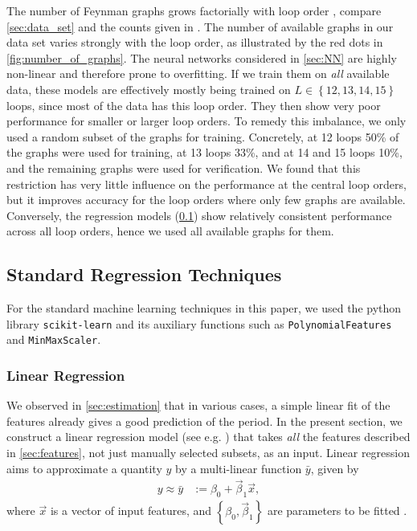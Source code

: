\documentclass[12pt]{article}
\numberwithin{equation}{section}
\begin{document}
The number of Feynman graphs grows factorially with loop order \cite{cvitanovic_number_1978,borinsky_renormalized_2017}, compare \cref{sec:data_set} and the counts given in \cite{balduf_statistics_2023}.   The number of available graphs in our data set varies strongly with the loop order, as illustrated by the red dots in \cref{fig:number_of_graphs}. The neural networks considered in \cref{sec:NN} are highly non-linear and therefore prone to overfitting. 
If we train them on \emph{all} available data, these models are effectively mostly being trained on $L\in \left \lbrace 12, 13,14,15 \right \rbrace $ loops, since most of the data has this loop order. They then show very poor performance for smaller or larger loop orders. To remedy this imbalance, we only used a random subset of the graphs for training. Concretely, at 12 loops 50\% of the graphs were used for training, at 13 loops 33\%, and at 14 and 15 loops 10\%, and the remaining graphs were used for verification. We found that this restriction has very little influence on the performance at the central loop orders, but it improves accuracy for the loop orders where only few graphs are available.  Conversely, the regression models   (\cref{sec:standard_machine_learning}) show relatively consistent performance across all loop orders, hence we used all available graphs for them. 





\subsection{Standard Regression Techniques}\label{sec:standard_machine_learning}

For the standard machine learning techniques in this paper, we used the python library  \texttt{scikit-learn}  \cite{pedregosa_scikitlearn_2012} and its auxiliary functions such as \texttt{PolynomialFeatures} and \texttt{MinMaxScaler}.  

\subsubsection{Linear Regression}\label{sec:linear_regression}
We observed in \cref{sec:estimation} that in various cases, a simple linear fit of the features already gives a good prediction of the period. In the present section, we construct a  linear regression model (see e.g. \cite{maulud_review_2020}) that takes \emph{all} the features described in \cref{sec:features}, not just manually selected subsets, as an input.
Linear regression aims to approximate a quantity $y$  by a multi-linear function $\bar y$, given by
\begin{align}\label{def:linear_regression}
y  \approx \bar y  &:= \beta_0 + \vec \beta_1 \vec x, 
\end{align}
where   $\vec x$ is a vector of input features, and $\left \lbrace \beta_0, \vec \beta_1 \right \rbrace $ are parameters to be fitted .
\end{document}
